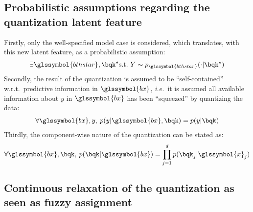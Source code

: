 \subsection{Probabilistic assumptions regarding the quantization latent feature}

Firstly, only the well-specified model case is considered, which translates, with this new latent feature, as a probabilistic assumption:
\begin{equation} \label{hyp:true}
\exists \glssymbol{bthstar}, \bqk^\star \text{s.t.\ } Y \sim p_{\glssymbol{bthstar}}(\cdot | \bqk^\star)
\end{equation}
Secondly, the result of the quantization is assumed to be ``self-contained'' w.r.t.\ predictive information in $\glssymbol{bx}$, \textit{i.e.}\ it is assumed all available information about $y$ in $\glssymbol{bx}$ has been ``squeezed'' by quantizing the data:
\begin{equation} \label{hyp:squeeze}
\forall \glssymbol{bx},y,\: p(y|\glssymbol{bx},\bqk) = p(y|\bqk)
\end{equation}
Thirdly, the component-wise nature of the quantization can be stated as:
\begin{equation} \label{hyp:component}
\forall \glssymbol{bx},\bqk,\: p(\bqk|\glssymbol{bx}) = \prod_{j=1}^d p(\bqk_j | \glssymbol{x}_j)
\end{equation}



\subsection{Continuous relaxation of the quantization as seen as fuzzy assignment} \label{subsec:fuzzy}


